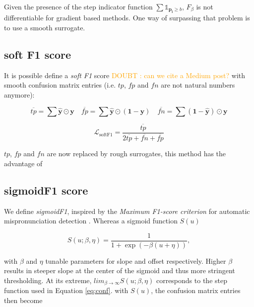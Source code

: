 \documentclass[sigconf,natbib,screen=true,review=true,anonymous]{acmart}
\newcommand\doubt[1]{\textcolor{orange}{DOUBT : #1}}
\begin{document}
Given the presence of the step indicator function \(\sum \mathds{1}_{\mathbf{p_i} \geq b}\), \(F_\beta\) is not differentiable for gradient based methods. One way of surpassing that problem is to use a smooth surrogate.

\subsection{soft F1 score}
\label{sec:org3ca83ef}

It is possible define a \emph{soft F1} score \cite{softF1} \doubt{can we cite a Medium post?} with smooth confusion matrix entries (i.e. \(tp\), \(fp\) and \(fn\) are not natural numbers anymore):

$$
\overline{tp}=\sum \hat{\mathbf{y}} \odot \mathbf{y} \quad \overline{fp} = \sum \hat{\mathbf{y}} \odot (\mathbf{1}- \mathbf{y}) \quad \overline{fn} = \sum (\mathbf{1} - \hat{\mathbf{y}}) \odot \mathbf{y}
$$

\begin{equation}
\mathcal{L}_{\text {softF1}}= \frac{\overline{tp}}{2 \overline{tp}+ \overline{fn}+ \overline{fp}}
\end{equation}

\(tp\), \(fp\) and \(fn\) are now replaced by rough surrogates, this method has the advantage of 


\subsection{sigmoidF1 score}
\label{sec:orgc5d29d7}

We define \emph{sigmoidF1}, inspired by the \emph{Maximum F1-score criterion} for automatic mispronunciation detection \cite{sigmoid}. Whereas a sigmoid function \(S(u)\)

\begin{equation}
S(u; \beta, \eta)=\frac{1}{1+\exp (-\beta (u + \eta))},
\end{equation}

with \(\beta\) and \(\eta\) tunable parameters for slope and offset respectively. Higher \(\beta\) results in steeper slope at the center of the sigmoid and thus more stringent thresholding. At its extreme, \(lim_{\beta\to\infty} S(u; \beta, \eta)\) corresponds to the step function used in Equation \ref{eq:conf}. with \(S(u)\), the confusion matrix entries then become
\end{document}
